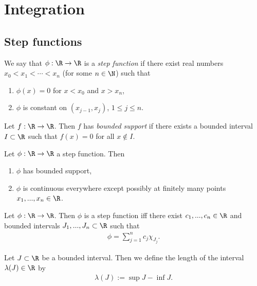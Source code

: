 \documentclass{article}
\begin{document}
\section{Integration}

\subsection{Step functions}

\begin{definition}
	We say that $\phi:\R\to\R$ is a \emph{step function} if there exist real numbers
	$x_0<x_1<\cdots < x_n$ (for some $n\in\N$) such that
	\begin{enumerate}
		\item $\phi(x)=0$ for $x<x_0$ and $x>x_n$,
		\item $\phi$ is constant on $(x_{j-1}, x_j)$, $1\leq j\leq n$.
	\end{enumerate}
\end{definition}

\begin{definition}
	Let $f:\R\to\R$. Then $f$ has \emph{bounded support} if there exists a bounded
	interval $I\subset\R$ such that $f(x)=0$ for all $x\not\in I$.
\end{definition}

\begin{lemma}
	Let $\phi:\R\to\R$ a step function. Then
	\begin{enumerate}
		\item $\phi$ has bounded support,
		\item $\phi$ is continuous everywhere except possibly at finitely many points
		      $x_1,...,x_n\in\R$.
	\end{enumerate}
\end{lemma}

\begin{lemma}[Example 4.2]
	Let $\phi:\R\to\R$. Then $\phi$ is a step function iff there exist $c_1,...,c_n\in\R$
	and bounded intervals $J_1,...,J_n\subset\R$ such that
	\begin{align*}
		\phi = \sum_{j=1}^n c_j\chi_{J_j}.
	\end{align*}
\end{lemma}

\begin{definition}
	Let $J\subset\R$ be a bounded interval. Then we define the length of the interval $\lambda(J)\in\R$ by
	\begin{align*}
		\lambda(J) := \sup J - \inf J.
	\end{align*}
\end{definition}
\end{document}
